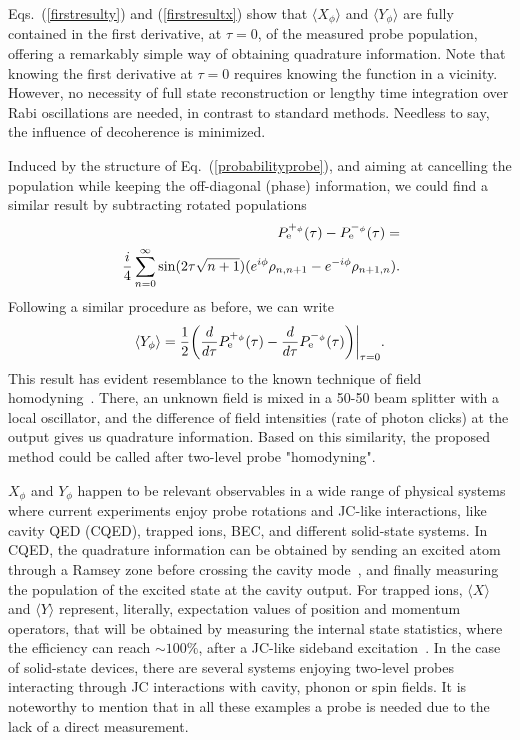\documentclass[pra,aps,twocolumn,showpacs]{revtex4}
\begin{document}
Eqs.~(\ref{firstresulty}) and (\ref{firstresultx}) show that
$\langle X_{\phi} \rangle$ and $\langle Y_{\phi} \rangle$ are
fully contained in the first derivative, at $\tau = 0$, of the
measured probe population, offering a remarkably simple way of
obtaining quadrature information. Note that knowing the first
derivative at $\tau = 0$ requires knowing the function in a
vicinity. However, no necessity of full state reconstruction or
lengthy time integration over Rabi oscillations are needed, in
contrast to standard methods. Needless to say, the influence of
decoherence is minimized.

Induced by the structure of Eq.~(\ref{probabilityprobe}), and
aiming at cancelling the population while keeping the off-diagonal
(phase) information, we could find a similar result by subtracting
rotated populations
\begin{eqnarray}
\label{probabilityhomodyning} && \!\!\!\!\!\!\!\!\!\!\!\!\!\!\!
P_{\rm e}^{+_{\phi}} (\tau) - P_{\rm e}^{-_{\phi}} (\tau)  =
\nonumber
\\ && \!\!\!\!\! \frac{i}{4} \sum^{\infty}_{n=0} \sin(2 \tau
\sqrt{n + 1}) (e^{i\phi}\rho_{n , n+1} - e^{-i\phi} \rho_{n+1 ,
n}) .
\end{eqnarray}
Following a similar procedure as before, we can write
\begin{eqnarray}
\label{homodyningy} \langle Y_{\phi} \rangle = \frac{1}{2} \bigg(
\frac{d}{d \tau} P_{\rm e}^{+_{\phi}} (\tau) - \frac{d}{d \tau}
P_{\rm e}^{-_{\phi}} (\tau) \bigg) \bigg\vert_{\tau = 0} .
\end{eqnarray}
This result has evident resemblance to the known technique of
field homodyning~\cite{MandelWolf}. There, an unknown field is
mixed in a 50-50 beam splitter with a local oscillator, and the
difference of field intensities (rate of photon clicks) at the
output gives us quadrature information. Based on this similarity,
the proposed method could be called after two-level probe
"homodyning".

$X_{\phi}$ and $Y_{\phi}$ happen to be relevant observables in a
wide range of physical systems where current experiments enjoy
probe rotations and JC-like interactions, like cavity QED (CQED),
trapped ions, BEC, and different solid-state systems. In CQED, the
quadrature information can be obtained by sending an excited atom
through a Ramsey zone before crossing the cavity
mode~\cite{ParisReview}, and finally measuring the population of
the excited state at the cavity output. For trapped ions, $\langle
X \rangle$ and $\langle Y \rangle$ represent, literally,
expectation values of position and momentum operators, that will
be obtained by measuring the internal state statistics, where the
efficiency can reach $\sim 100 \%$, after a JC-like sideband
excitation~\cite{IonsReview}. In the case of solid-state devices,
there are several systems enjoying two-level probes interacting
through JC interactions with cavity, phonon or spin fields. It is
noteworthy to mention that in all these examples a probe is needed
due to the lack of a direct measurement.
\end{document}
